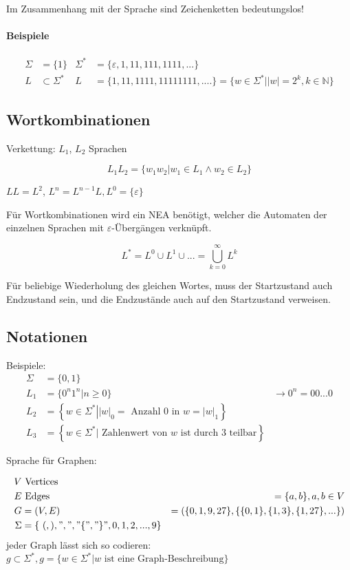 Im Zusammenhang mit der Sprache sind Zeichenketten bedeutungslos!


\paragraph{Beispiele}

\begin{align*}
\Sigma &= \{1\} & \Sigma^\ast &= \{\varepsilon, 1,11,111,1111,...\} \\
L &\subset \Sigma^\ast  & L &=\{1,11,1111,11111111,....\} = \{w \in \Sigma^\ast| |w|=2^k, k \in \mathbb{N}\}
\end{align*}

\subsection{Wortkombinationen}

Verkettung: $L_1$, $L_2$ Sprachen

\[
	L_1 L_2 = \{w_1 w_2 | w_1 \in L_1 \land w_2 \in L_2 \}
\]

$LL = L^2$, $L^n = L^{n-1}L, L^0 = \{\varepsilon\}$


Für Wortkombinationen wird ein NEA benötigt, welcher die Automaten der einzelnen Sprachen mit $\varepsilon$-Übergängen verknüpft.

\[
	L^\ast = L^0 \cup L^1 \cup ... = \bigcup^\infty_{k=0}{L^k}
\]

Für beliebige Wiederholung des gleichen Wortes, muss der Startzustand auch Endzustand sein, und die Endzustände auch auf den Startzustand verweisen.


\subsection{Notationen}
Beispiele:
\begin{align*}
	\Sigma &= \{0,1\} \\
	L_1 &= \{0^n 1^n | n \geq 0\} &\rightarrow 0^n = 00...0 \\
	L_2 &= \left\{ w \in \Sigma^\ast \left| \left|w\right|_0 = \text{ Anzahl 0 in } w = \left|w\right|_1 \right.\right\} \\
	L_3 &= \left\{w \in \Sigma^\ast \left| \text{ Zahlenwert von } w \text{ ist durch 3 teilbar} \right.\right\}
\end{align*}

Sprache für Graphen:

\begin{align*}
V & \text{ Vertices} \\
E & \text{ Edges} &= \{a,b\}, a,b \in V \\
G &= (V, E) &= (\{0,1,9,27\},\{\{0,1\},\{1,3\},\{1,27\},...\}) \\
\Sigma &= \left\{\ (,),",","\{","\}", 0, 1,2,...,9 \right\}
\end{align*}
jeder Graph lässt sich so codieren: $g \subset \Sigma^\ast, g = \{w \in \Sigma^\ast \left| w \text{ ist eine Graph-Beschreibung} \right.\}$

